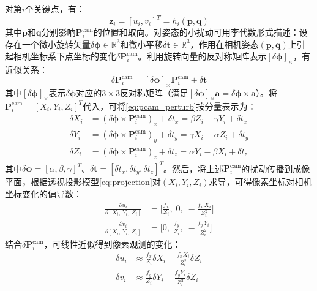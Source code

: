 对第$i$个关键点，有：
\begin{equation}
	\mathbf{z}_{i} = [u_i, v_i]^T = h_i(\mathbf{p},\mathbf{q})
\end{equation}
其中$\mathbf{p}$和$\mathbf{q}$分别影响$\mathbf{P}_i^{\mathrm{cam}}$的位置和取向。对姿态的小扰动可用李代数形式描述：设存在一个微小旋转矢量$\delta \boldsymbol{\phi}\in \mathbb{R}^3$和微小平移$\delta \mathbf{t}\in\mathbb{R}^3$，作用在相机姿态$(\mathbf{p},\mathbf{q})$上引起相机坐标系下点坐标的变化$\delta \mathbf{P}_i^{\mathrm{cam}}$。利用旋转向量的反对称矩阵表示$[\delta \boldsymbol{\phi}]_\times$，有近似关系：
\begin{equation}\label{eq:pcam_perturb}
	\delta \mathbf{P}_i^{\mathrm{cam}} = [\delta \boldsymbol{\phi}]_{\times}\mathbf{P}_i^{\mathrm{cam}} + \delta \mathbf{t}
\end{equation}
其中$[\delta \boldsymbol{\phi}]_{\times}$表示$\delta \boldsymbol{\phi}$对应的$3\times 3$反对称矩阵（满足$[\delta \boldsymbol{\phi}]_{\times} \mathbf{a} = \delta \boldsymbol{\phi} \times \mathbf{a}$）。将$\mathbf{P}_i^{\mathrm{cam}}=[X_i, Y_i, Z_i]^T$代入，可将\eqref{eq:pcam_perturb}按分量表示为：
\begin{align}
	\delta X_i &= (\delta \boldsymbol{\phi}\times \mathbf{P}_i^{\mathrm{cam}})_x + \delta t_x = \beta Z_i - \gamma Y_i + \delta t_x\\
	\delta Y_i &= (\delta \boldsymbol{\phi}\times \mathbf{P}_i^{\mathrm{cam}})_y + \delta t_y = \gamma X_i - \alpha Z_i + \delta t_y\\
	\delta Z_i &= (\delta \boldsymbol{\phi}\times \mathbf{P}_i^{\mathrm{cam}})_z + \delta t_z = \alpha Y_i - \beta X_i + \delta t_z
\end{align}
其中$\delta \boldsymbol{\phi}=[\alpha,\beta,\gamma]^T$、$\delta \mathbf{t}=[\delta t_x,\delta t_y,\delta t_z]^T$。然后，将上述$\mathbf{P}_i^{\mathrm{cam}}$的扰动传播到成像平面，根据透视投影模型\eqref{eq:projection}对$(X_i,Y_i,Z_i)$求导，可得像素坐标对相机坐标变化的偏导数：
\begin{equation}
	\begin{aligned}
		\frac{\partial u_i}{\partial [X_i,\,Y_i,\,Z_i]}
		&= \biggl[\frac{f_x}{Z_i},\;0,\;-\frac{f_x\,X_i}{Z_i^2}\biggr]\\[6pt]
		\frac{\partial v_i}{\partial [X_i,\,Y_i,\,Z_i]}
		&= \biggl[0,\;\frac{f_y}{Z_i},\;-\frac{f_y\,Y_i}{Z_i^2}\biggr]
	\end{aligned}
\end{equation}
结合$\delta \mathbf{P}_i^{\mathrm{cam}}$，可线性近似得到像素观测的变化：
\begin{equation}\label{eq:uv_perturb}
	\begin{aligned}
		\delta u_i &\approx \frac{f_x}{Z_i}\delta X_i - \frac{f_x X_i}{Z_i^2}\delta Z_i\\
		\delta v_i &\approx \frac{f_y}{Z_i}\delta Y_i - \frac{f_y Y_i}{Z_i^2}\delta Z_i
	\end{aligned}
\end{equation}
